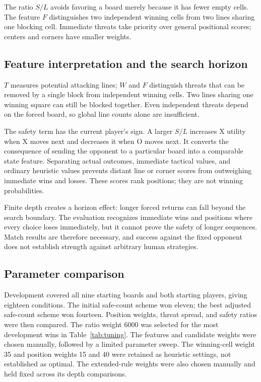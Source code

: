 \documentclass[UTF8,fontset=fandol,11pt,a4paper]{ctexart}
\begin{document}
The ratio $S/L$ avoids favoring a board merely because it has fewer empty
cells. The feature $F$ distinguishes two independent winning cells from
two lines sharing one blocking cell. Immediate threats take priority over
general positional scores; centers and corners have smaller weights.

\subsection{Feature interpretation and the search horizon}
$T$ measures potential attacking lines; $W$ and $F$ distinguish threats
that can be removed by a single block from independent winning cells.
Two lines sharing one winning square can still be blocked together.
Even independent threats depend on the forced board, so global line
counts alone are insufficient.

The safety term has the current player's sign. A larger $S/L$ increases
X utility when X moves next and decreases it when O moves next. It converts
the consequence of sending the opponent to a particular board into a
comparable state feature. Separating actual outcomes, immediate tactical
values, and ordinary heuristic values prevents distant line or corner
scores from outweighing immediate wins and losses. These scores rank
positions; they are not winning probabilities.

Finite depth creates a horizon effect: longer forced returns can fall
beyond the search boundary. The evaluation recognizes immediate wins
and positions where every choice loses immediately, but it cannot prove
the safety of longer sequences. Match results are therefore necessary,
and success against the fixed opponent does not establish strength
against arbitrary human strategies.

\clearpage
\subsection{Parameter comparison}
Development covered all nine starting boards and both starting players,
giving eighteen conditions. The initial safe-count scheme won eleven;
the best adjusted safe-count scheme won fourteen. Position weights,
threat spread, and safety ratios were then compared. The ratio weight
6000 was selected for the most development wins in Table~\ref{tab:tuning}.
The features and candidate weights were chosen manually, followed by a
limited parameter sweep. The winning-cell weight 35 and position weights
15 and 40 were retained as heuristic settings, not established as optimal.
The extended-rule weights were also chosen manually and held fixed across
its depth comparisons.
\end{document}
